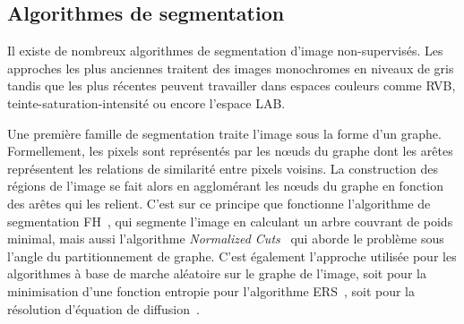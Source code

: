 \subsection{Algorithmes de segmentation}
\label{sec:segmentations}

Il existe de nombreux algorithmes de segmentation d'image non-supervisés. Les approches les plus anciennes traitent des images monochromes en niveaux de gris tandis que les plus récentes peuvent travailler dans espaces couleurs comme \gls{RVB}, teinte-saturation-intensité ou encore l'espace \gls{LAB}.

Une première famille de segmentation traite l'image sous la forme d'un graphe. Formellement, les pixels sont représentés par les n\oe{}uds du graphe dont les arêtes représentent les relations de similarité entre pixels voisins. La construction des régions de l'image se fait alors en agglomérant les nœuds du graphe en fonction des arêtes qui les relient. C'est sur ce principe que fonctionne l'algorithme de segmentation \gls{FH}~\cite{felzenszwalb_efficient_2004}, qui segmente l'image en calculant un arbre couvrant de poids minimal, mais aussi l'algorithme \emph{Normalized Cuts}~\cite{shi_normalized_2000} qui aborde le problème sous l'angle du partitionnement de graphe. C'est également l'approche utilisée pour les algorithmes à base de marche aléatoire sur le graphe de l'image, soit pour la minimisation d'une fonction entropie pour l'algorithme \gls{ERS}~\cite{liu_entropy_2011}, soit pour la résolution d'équation de diffusion~\cite{grady_random_2006}.

